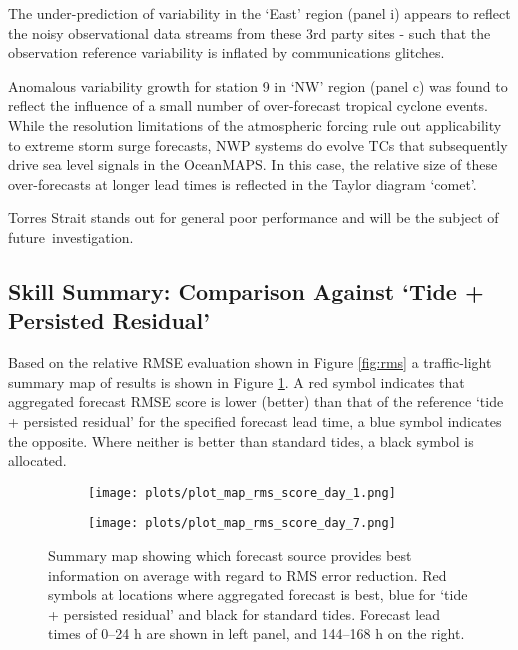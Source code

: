 \documentclass[jmse,article,accept,moreauthors,pdftex,10pt,a4paper]{mdpi}
\begin{document}
The under-prediction of variability in the `East' region (panel i) appears to reflect the noisy observational data streams from these 3rd party sites - such that the observation reference variability is inflated by communications glitches.

Anomalous variability growth for station 9 in `NW' region (panel c) was found to reflect the influence of a small number of over-forecast tropical cyclone events.  While the resolution limitations of the atmospheric forcing rule out applicability to extreme storm surge forecasts, NWP systems do evolve TCs that subsequently drive sea level signals in the OceanMAPS. In this case, the relative size of these over-forecasts at longer lead times is reflected in the Taylor diagram `comet'.

Torres Strait stands out for general poor performance and will be the subject of future~investigation.



\subsection{Skill Summary: Comparison Against `Tide + Persisted Residual'}
Based on the relative RMSE evaluation shown in Figure \ref{fig:rms} a traffic-light summary map of results is shown in Figure \ref{fig:map_rms}.
A red symbol indicates that aggregated forecast RMSE score is lower (better) than that of the reference `tide + persisted residual' for the specified forecast lead time, a blue symbol indicates the opposite.  Where neither is better than standard tides, a black symbol is allocated.   
\begin{figure}[H]
    \centering
    \begin{subfigure}[b]{0.45\textwidth}
        \texttt{[image: plots/plot\_map\_rms\_score\_day\_1.png]}
    \end{subfigure}
    \begin{subfigure}[b]{0.45\textwidth}
        \texttt{[image: plots/plot\_map\_rms\_score\_day\_7.png]}
    \end{subfigure}
    \caption{ Summary map showing which forecast source provides best information on average with regard to RMS error reduction. Red symbols at locations where aggregated forecast is best, blue for `tide + persisted residual' and black for standard tides.  Forecast lead times of 0--24 h are shown in left panel, and 144--168 h on the right.}
    \label{fig:map_rms}\vspace{-3pt}
\end{figure}   
\end{document}
